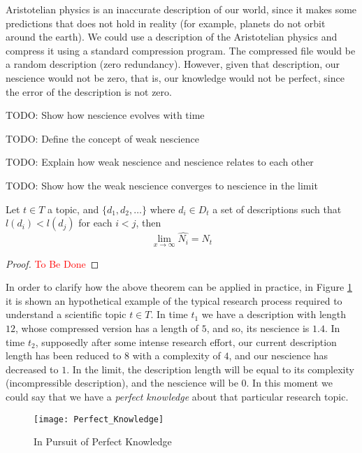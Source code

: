 \begin{example}
Aristotelian physics is an inaccurate description of our world, since it makes some predictions that does not hold in reality (for example, planets do not orbit around the earth). We could use a description of the Aristotelian physics and compress it using a standard compression program. The compressed file would be a random description (zero redundancy). However, given that description, our nescience would not be zero, that is, our knowledge would not be perfect, since the error of the description is not zero.
\end{example}

{\color{red} TODO: Show how nescience evolves with time}

{\color{red} TODO: Define the concept of weak nescience}

{\color{red} TODO: Explain how weak nescience and nescience relates to each other}

{\color{red} TODO: Show how the weak nescience converges to nescience in the limit}

\begin{theorem}
Let $t\in T$ a topic, and $\{d_1, d_2, \ldots \}$ where $d_i \in D_t$ a set of descriptions such that $ l(d_i) < l(d_j)$ for each $i < j$, then
\[
\lim_{x \to \infty} \hat{N_i} = N_t
\]
\end{theorem}
\begin{proof}
\textcolor{red}{To Be Done}
\end{proof}

\begin{example}
In order to clarify how the above theorem can be applied in practice, in Figure \ref{fig:Perfect_Knowledge} it is shown an hypothetical example of the typical research process required to understand a scientific topic $t\in T$. In time $t_{1}$ we have a description with length $12$, whose compressed version has a length of $5$, and so, its nescience is $1.4$. In time $t_{2}$, supposedly after some intense research effort, our current description length has been reduced to $8$ with a complexity of $4$, and our nescience has decreased to $1$. In the limit, the description length will be equal to its complexity (incompressible description), and the nescience will be 0. In this moment we could say that we have a \emph{perfect knowledge} about that particular research topic.
\end{example}

\begin{figure}[h]
\centering\texttt{[image: Perfect\_Knowledge]}
\caption{\label{fig:Perfect_Knowledge}In Pursuit of Perfect Knowledge}
\end{figure}

